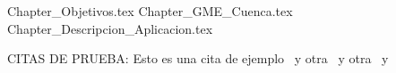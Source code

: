 \documentclass[a4paper,openany,oneside,12pt]{book}
\begin{document}

%	
	\newpage
	\mbox{}
	\thispagestyle{empty} %
	


	\tableofcontents
	\listoffigures %
	\listoftables
	

	


	{Chapter_Objetivos.tex}
	{Chapter_GME_Cuenca.tex}
	{Chapter_Descripcion_Aplicacion.tex}
	
	CITAS DE PRUEBA: Esto es una cita de ejemplo~\cite{Lieb} y otra~\cite{Supper} y otra~\cite{Curtis} y~\cite{GME}

\end{document}
